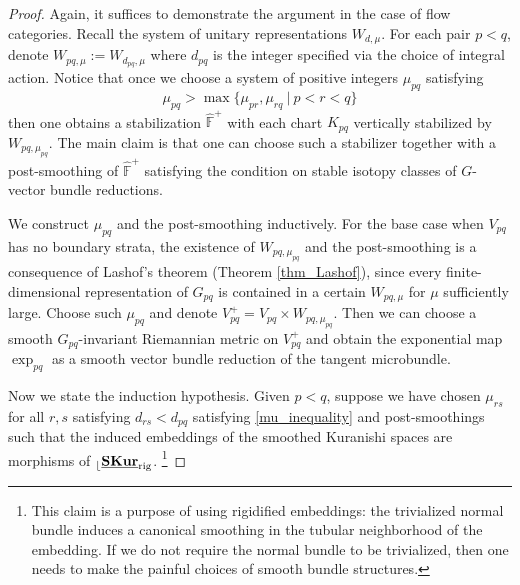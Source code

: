 \documentclass[reqno, 10pt]{amsart}
\numberwithin{equation}{section}
\numberwithin{equation}{section}
\theoremstyle{definition}
\theoremstyle{remark}
\newcommand{\beq}{\begin{equation}}
\newcommand{\eeq}{\end{equation}}
\newcommand{\mb}{\mathbb}
\renewcommand{\outer}{{}_{\lfloor}}
\newcommand{\uds}[1]{\underline{\smash{#1}}}
\begin{document}
\begin{proof}
Again, it suffices to demonstrate the argument in the case of flow categories. Recall the system of unitary representations $W_{d, \mu}$. For each pair $p<q$, denote $W_{pq, \mu}:= W_{d_{pq}, \mu}$ where $d_{pq}$ is the integer specified via the choice of integral action. Notice that once we choose a system of positive integers $\mu_{pq}$ satisfying 
\beq\label{mu_inequality}
\mu_{pq} > \max \{ \mu_{pr}, \mu_{rq}\ |\ p < r < q \}
\eeq
then one obtains a stabilization $\hat {\mb F}^+$ with each chart $K_{pq}$ vertically stabilized by $W_{pq, \mu_{pq}}$. The main claim is that one can choose such a stabilizer together with a post-smoothing of $\hat {\mb F}^+$ satisfying the condition on stable isotopy classes of $G$-vector bundle reductions. 

We construct $\mu_{pq}$ and the post-smoothing inductively. For the base case when $V_{pq}$ has no boundary strata, the existence of $W_{pq, \mu_{pq}}$ and the post-smoothing is a consequence of Lashof's theorem (Theorem \ref{thm_Lashof}), since every finite-dimensional representation of $G_{pq}$ is contained in a certain $W_{pq, \mu}$ for $\mu$ sufficiently large. Choose such $\mu_{pq}$ and denote $V_{pq}^+ = V_{pq} \times W_{pq, \mu_{pq}}$. Then we can choose a smooth $G_{pq}$-invariant Riemannian metric on $V_{pq}^+$ and obtain the exponential map $\exp_{pq}$ as a smooth vector bundle reduction of the tangent microbundle. 

Now we state the induction hypothesis. Given $p<q$, suppose we have chosen $\mu_{rs}$ for all $r, s$ satisfying $d_{rs} < d_{pq}$ satisfying \eqref{mu_inequality} and post-smoothings such that the induced embeddings of the smoothed Kuranishi spaces are morphisms of $\outer \uds{\bf SKur}_{\rm rig}$. \footnote{This claim is a purpose of using rigidified embeddings: the trivialized normal bundle induces a canonical smoothing in the tubular neighborhood of the embedding. If we do not require the normal bundle to be trivialized, then one needs to make the painful choices of smooth bundle structures.}


\end{proof}
\end{document}

